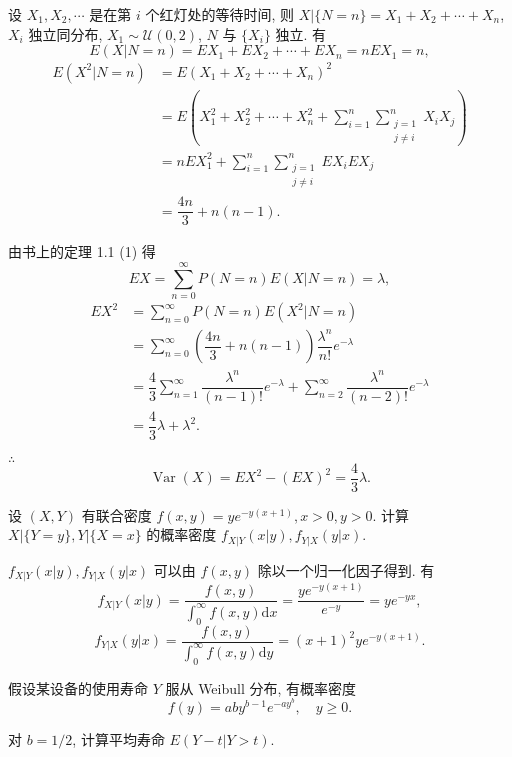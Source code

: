 \documentclass[color=black,device=normal,lang=cn]{elegantnote}
\numberwithin{equation}{section}
\theoremstyle{plain}
\numberwithin{exercise}{exsection}
\begin{document}
\begin{solution}
    设 $X_1,X_2,\cdots$ 是在第 $i$ 个红灯处的等待时间, 则 $X|\{N=n\}=X_1+X_2+\cdots+X_n$, $X_i$ 独立同分布, $X_1\sim\mathcal{U}(0,2)$, $N$ 与 $\{X_i\}$ 独立. 有
    \[E(X|N=n)=EX_1+EX_2+\cdots+EX_n=nEX_1=n,\]
    \begin{align*}
        E(X^2|N=n) & =E(X_1+X_2+\cdots+X_n)^2 \\
        & =E\left(X_1^2+X_2^2+\cdots+X_n^2+\sum\limits_{i=1}^n\sum\limits_{\substack{j=1\\j\neq i}}^nX_iX_j\right) \\
        & =nEX_1^2+\sum\limits_{i=1}^n\sum\limits_{\substack{j=1\\j\neq i}}^nEX_iEX_j \\
        & =\dfrac{4n}{3}+n(n-1).
    \end{align*}

    由书上的定理 1.1 (1) 得
    \[EX=\sum\limits_{n=0}^\infty P(N=n)E(X|N=n)=\lambda,\]
    \begin{align*}
        EX^2 & =\sum\limits_{n=0}^\infty P(N=n)E(X^2|N=n) \\
        & =\sum\limits_{n=0}^\infty\left(\dfrac{4n}{3}+n(n-1)\right)\dfrac{\lambda^n}{n!}e^{-\lambda}  \\
        & =\dfrac{4}{3}\sum\limits_{n=1}^\infty\dfrac{\lambda^n}{(n-1)!}e^{-\lambda}+\sum\limits_{n=2}^\infty\dfrac{\lambda^n}{(n-2)!}e^{-\lambda}  \\
        & =\dfrac{4}{3}\lambda+\lambda^2.
    \end{align*}

    $\therefore$
    \[\operatorname{Var}(X)=EX^2-(EX)^2=\dfrac{4}{3}\lambda.\]
\end{solution}
\addtocounter{exercise}{4}
\begin{exercise}%
    设 $(X,Y)$ 有联合密度 $f(x,y)=ye^{-y(x+1)},x>0,y>0$. 计算 $X|\{Y=y\},Y|\{X=x\}$ 的概率密度 $f_{X|Y}(x|y),f_{Y|X}(y|x)$.
\end{exercise}
\begin{solution}
    $f_{X|Y}(x|y),f_{Y|X}(y|x)$ 可以由 $f(x,y)$ 除以一个归一化因子得到. 有
    \[f_{X|Y}(x|y)=\dfrac{f(x,y)}{\int_0^\infty f(x,y)\mathrm{d}x}=\dfrac{ye^{-y(x+1)}}{e^{-y}}=ye^{-yx},\]
    \[f_{Y|X}(y|x)=\dfrac{f(x,y)}{\int_0^\infty f(x,y)\mathrm{d}y}=(x+1)^2ye^{-y(x+1)}.\]
\end{solution}
\addtocounter{exercise}{4}
\begin{exercise}%
    假设某设备的使用寿命 $Y$ 服从 Weibull 分布, 有概率密度
    \[f(y)=aby^{b-1}e^{-ay^b},\quad y\geq0.\]

    对 $b=1/2$, 计算平均寿命 $E(Y-t|Y>t)$.
\end{exercise}
\end{document}
